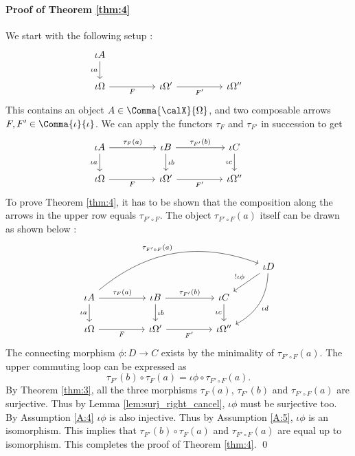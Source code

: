 \documentclass[12pt,oneside]{article}
\begin{document}
\paragraph{Proof of Theorem \ref{thm:4}} We start with the following setup : %
\[\begin{tikzcd}
	\iota A \arrow[d, "\iota a"']  \\
	\iota \Omega \arrow[rr, "F"'] & & \iota \Omega' \arrow[rr, "F'"'] & & \iota \Omega'' & 
\end{tikzcd}\]
% 
This contains an object $A\in \Comma{\calX}{\Omega}$, and two composable arrows $F, F' \in \Comma{\iota}{\iota}$. We can apply the functors $\tau_F$ and $\tau_{F'}$ in succession to get
%
\[\begin{tikzcd}
	\iota A \arrow[d, "\iota a"'] \arrow[rr, "\tau_{F} (a)"] & & \iota B \arrow[d, "\iota b"] \arrow[rr, "\tau_{F'} (b)"] & & \iota C \arrow[d, "\iota c"']  & \\ 
	\iota \Omega \arrow[rr, "F"'] & & \iota \Omega' \arrow[rr, "F'"'] & & \iota \Omega'' & 
\end{tikzcd}\]
% 
To prove Theorem \ref{thm:4}, it has to be shown that the composition along the arrows in the upper row equals $\tau_{F'\circ F}$. The object $\tau_{F'\circ F}(a)$ itself can be drawn as shown below :
%
\[\begin{tikzcd}
	& & & & & \iota D \arrow[ldd, "\iota d", bend left]  \arrow[ld, "! \iota \phi"'] \\
	\iota A \arrow[d, "\iota a"'] \arrow[rr, "\tau_{F} (a)"] \arrow[rrrrru, "\tau_{F'\circ F} (a)", bend left] & & \iota B \arrow[d, "\iota b"] \arrow[rr, "\tau_{F'} (b)"] & & \iota C \arrow[d, "\iota c"'] & \\
	\iota \Omega \arrow[rr, "F"'] & & \iota \Omega' \arrow[rr, "F'"'] & & \iota \Omega'' & 
\end{tikzcd}\]
% 
The connecting morphism $\phi : D \to C$ exists by the minimality of $\tau_{F'\circ F}(a)$. The upper commuting loop can be expressed as
%
\[ \tau_{F'} (b) \circ \tau_{F} (a) = \iota \phi \circ \tau_{F'\circ F} (a) . \]
%
By Theorem \ref{thm:3}, all the three morphisms $\tau_{F} (a)$, $\tau_{F'} (b)$ and $\tau_{F'\circ F} (a)$ are surjective. Thus by Lemma \ref{lem:surj_right_cancel}, $\iota \phi$ must be surjective too. By Assumption \ref{A:4} $\iota \phi$ is also injective. Thus by Assumption \ref{A:5}, $\iota \phi$ is an isomorphism. This implies that $\tau_{F'} (b) \circ \tau_{F} (a)$ and $\tau_{F'\circ F} (a)$ are equal up to isomorphism. This completes the proof of Theorem \ref{thm:4}. \qed 
\end{document}
